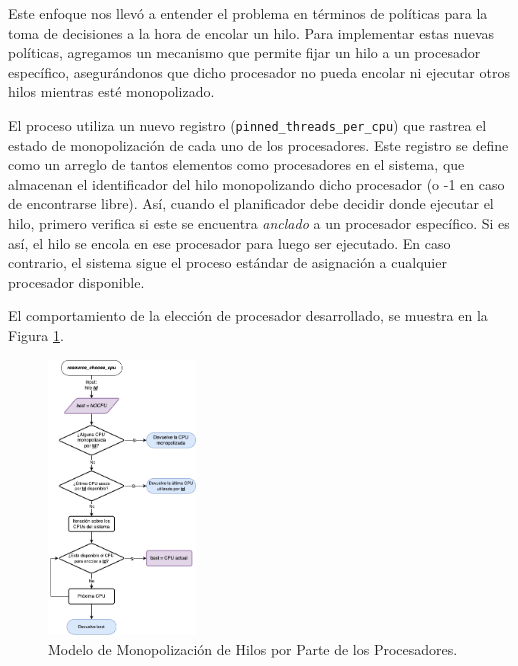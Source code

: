 Este enfoque nos llevó a entender el problema en términos de políticas para la toma de decisiones a la hora de encolar un hilo. Para implementar estas nuevas políticas, agregamos un mecanismo que permite fijar un hilo a un procesador específico, asegurándonos que dicho procesador no pueda encolar ni ejecutar otros hilos mientras esté monopolizado.\par

El proceso utiliza un nuevo registro (\verb|pinned_threads_per_cpu|) que rastrea el estado de monopolización de cada uno de los procesadores. Este registro se define como un arreglo de tantos elementos como procesadores en el sistema, que almacenan el identificador del hilo monopolizando dicho procesador (o -1 en caso de encontrarse libre). Así, cuando el planificador debe decidir donde ejecutar el hilo, primero verifica si este se encuentra \textit{anclado} a un procesador específico. Si es así, el hilo se encola en ese procesador para luego ser ejecutado. En caso contrario, el sistema sigue el proceso estándar de asignación a cualquier procesador disponible.\par

El comportamiento de la elección de procesador desarrollado, se muestra en la Figura \ref{fig:monopolization_resource-choose-cpu}.\par

\vspace{.50cm}
\begin{figure}[H]
    \centering
    \includegraphics[width=0.35\textwidth]{images/monopolized_choose-cpu.png}
    \caption{Modelo de Monopolización de Hilos por Parte de los Procesadores.}
    \label{fig:monopolization_resource-choose-cpu}
\end{figure}

